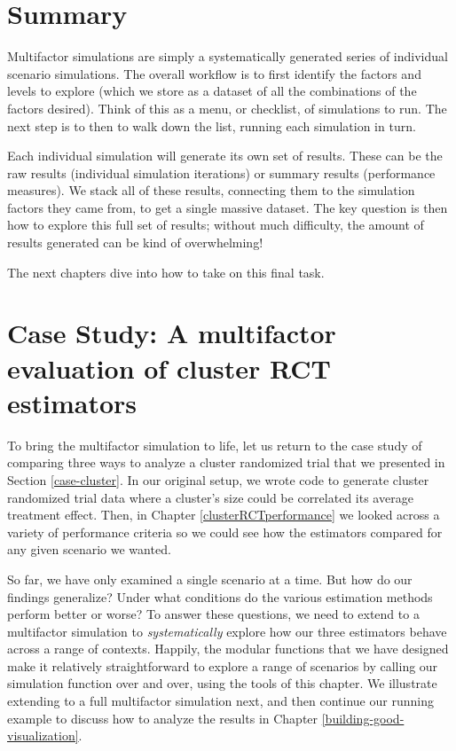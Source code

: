 \documentclass[
]{book}
\begin{document}
\section{Summary}\label{summary}

Multifactor simulations are simply a systematically generated series of individual scenario simulations.
The overall workflow is to first identify the factors and levels to explore (which we store as a dataset of all the combinations of the factors desired).
Think of this as a menu, or checklist, of simulations to run.
The next step is to then to walk down the list, running each simulation in turn.

Each individual simulation will generate its own set of results.
These can be the raw results (individual simulation iterations) or summary results (performance measures).
We stack all of these results, connecting them to the simulation factors they came from, to get a single massive dataset.
The key question is then how to explore this full set of results; without much difficulty, the amount of results generated can be kind of overwhelming!

The next chapters dive into how to take on this final task.

\section{Case Study: A multifactor evaluation of cluster RCT estimators}\label{case-study-a-multifactor-evaluation-of-cluster-rct-estimators}

To bring the multifactor simulation to life, let us return to the case study of comparing three ways to analyze a cluster randomized trial that we presented in Section \ref{case-cluster}.
In our original setup, we wrote code to generate cluster randomized trial data where a cluster's size could be correlated its average treatment effect.
Then, in Chapter \ref{clusterRCTperformance} we looked across a variety of performance criteria so we could see how the estimators compared for any given scenario we wanted.

So far, we have only examined a single scenario at a time.
But how do our findings generalize? Under what conditions do the various estimation methods perform better or worse?
To answer these questions, we need to extend to a multifactor simulation to \emph{systematically} explore how our three estimators behave across a range of contexts.
Happily, the modular functions that we have designed make it relatively straightforward to explore a range of scenarios by calling our simulation function over and over, using the tools of this chapter.
We illustrate extending to a full multifactor simulation next, and then continue our running example to discuss how to analyze the results in Chapter \ref{building-good-visualization}.
\end{document}
